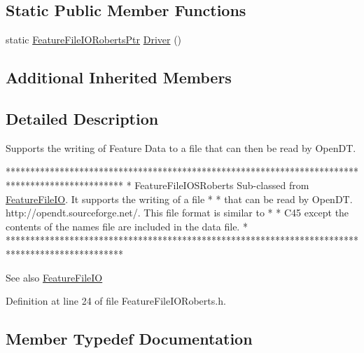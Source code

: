 \subsection*{Static Public Member Functions}
\begin{DoxyCompactItemize}
\item 
static \hyperlink{class_k_k_m_l_l_1_1_feature_file_i_o_roberts_ae26de443b3cf09b54cbadd52770bf10c}{Feature\+File\+I\+O\+Roberts\+Ptr} \hyperlink{class_k_k_m_l_l_1_1_feature_file_i_o_roberts_ae38df710ef5980430946716d8222bf13}{Driver} ()
\end{DoxyCompactItemize}
\subsection*{Additional Inherited Members}


\subsection{Detailed Description}
Supports the writing of Feature Data to a file that can then be read by Open\+DT. 


\begin{DoxyCode}
************************************************************************************************
*  FeatureFileIOSRoberts  Sub-classed from \hyperlink{class_k_k_m_l_l_1_1_feature_file_i_o_a820170380cfca6a036a29d2c51b8441a}{FeatureFileIO}.  It supports the writing of a file  
       *
*  that can be read by OpenDT. http:\textcolor{comment}{//opendt.sourceforge.net/.  This file format is similar to *    }
*  C45 except the contents of the names file are included in the data file.                    *
************************************************************************************************
\end{DoxyCode}
 \begin{DoxySeeAlso}{See also}
\hyperlink{class_k_k_m_l_l_1_1_feature_file_i_o}{Feature\+File\+IO} 
\end{DoxySeeAlso}


Definition at line 24 of file Feature\+File\+I\+O\+Roberts.\+h.



\subsection{Member Typedef Documentation}
